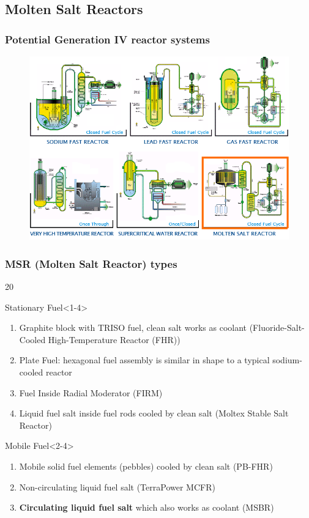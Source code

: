 \subsection{Molten Salt Reactors}

\begin{frame}
\frametitle{Potential Generation IV reactor systems \cite{abram_generation-iv_2008}}
\begin{figure}[t]
	\vspace*{-0.1in}
	\includegraphics[height=0.7\textwidth]{./images/6_types.png}
\end{figure}            
\end{frame}


\begin{frame}
\frametitle{MSR (Molten Salt Reactor) types}
\begin{overlayarea}{\linewidth}{20\baselineskip}
\begin{block}{Stationary Fuel}<1-4>
	\begin{enumerate}
		\item Graphite block with TRISO fuel, clean salt works as 
		coolant (Fluoride-Salt-Cooled High-Temperature 
		Reactor (FHR))
		\item Plate Fuel: hexagonal fuel assembly is similar in shape to a typical sodium-cooled reactor
		\item Fuel Inside Radial Moderator (FIRM)
		\item Liquid fuel salt inside fuel rods cooled by clean salt 
		(Moltex Stable Salt Reactor)
	\end{enumerate}
\end{block}

\begin{block}{Mobile Fuel}<2-4>
	\begin{enumerate}
		\item<2-4> Mobile solid fuel elements (pebbles) cooled by 
		clean salt (PB-FHR)
		\item<3-4> Non-circulating liquid fuel salt (TerraPower \gls{MCFR}) 
		\item<4> \textbf{Circulating liquid fuel salt} which also works 
		as coolant (\gls{MSBR})
	\end{enumerate}
\end{block}
\end{overlayarea}
\end{frame}

